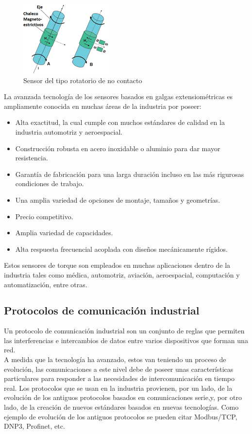 \documentclass[12pt,titlepage]{article}
\begin{document}
\begin{figure}[htbp]
\hspace*{5.6cm} 
\includegraphics[scale=0.89]{no_contact_sens}
\caption{Sensor del tipo rotatorio de no contacto}
\end{figure}
\newpage
La avanzada tecnología de los sensores basados en galgas extensiométricas es ampliamente conocida en muchas áreas de la industria por poseer: \\

\begin{itemize}
\item Alta exactitud, la cual cumple con muchos estándares de calidad en la industria automotriz y aeroespacial.
\item Construcción robusta en acero inoxidable o aluminio para dar mayor resistencia. 
\item Garantía de fabricación para una larga duración incluso en las más rigurosas condiciones de trabajo. 
\item Una amplia variedad de opciones de montaje, tamaños y geometrías. 
\item Precio competitivo.
\item Amplia variedad de capacidades.
\item Alta respuesta frecuencial acoplada con diseños mecánicamente rígidos. 
\end{itemize}

Estos sensores de torque son empleados en muchas aplicaciones dentro de la industria tales como médica, automotriz, aviación, aeroespacial, computación y automatización, entre otras. 
\subsection{Protocolos de comunicación industrial}
Un protocolo de comunicación industrial son un conjunto de reglas que permiten las interferencias e intercambios de datos entre varios dispositivos que forman una red. \\

A medida que la tecnología ha avanzado, estos van teniendo un proceso de evolución, las comunicaciones a este nivel debe de poseer unas características particulares para responder a las necesidades de intercomunicación en tiempo real. Los protocolos que se usan en la industria provienen, por un lado, de la evolución de los antiguos protocolos basados en comunicaciones serie,y, por otro lado, de la creación de nuevos estándares basados en nuevas tecnologías. Como ejemplo de evolución de los antiguos protocolos se pueden citar Modbus/TCP, DNP3, Profinet, etc. \\
\end{document}
